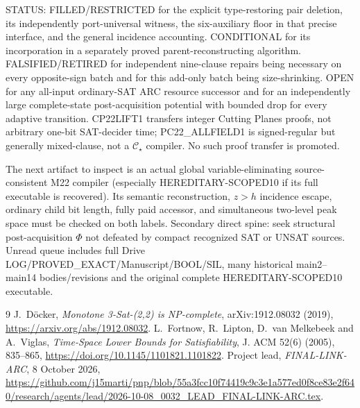 \documentclass[11pt]{article}
\begin{document}
STATUS: FILLED/RESTRICTED for the explicit type-restoring pair deletion, its independently port-universal witness, the six-auxiliary floor in that precise interface, and the general incidence accounting. CONDITIONAL for its incorporation in a separately proved parent-reconstructing algorithm. FALSIFIED/RETIRED for independent nine-clause repairs being necessary on every opposite-sign batch and for this add-only batch being size-shrinking. OPEN for any all-input ordinary-SAT ARC resource successor and for an independently large complete-state post-acquisition potential with bounded drop for every adaptive transition. CP22LIFT1 transfers integer Cutting Planes proofs, not arbitrary one-bit SAT-decider time; PC22_ALLFIELD1 is signed-regular but generally mixed-clause, not a $\mathcal C_\star$ compiler. No such proof transfer is promoted.

The next artifact to inspect is an actual global variable-eliminating source-consistent M22 compiler (especially HEREDITARY-SCOPED10 if its full executable is recovered). Its semantic reconstruction, $z>h$ incidence escape, ordinary child bit length, fully paid accessor, and simultaneous two-level peak space must be checked on both labels. Secondary direct spine: seek structural post-acquisition $\Phi$ not defeated by compact recognized SAT or UNSAT sources. Unread queue includes full Drive LOG/PROVED\_EXACT/Manuscript/BOOL/SIL, many historical main2--main14 bodies/revisions and the original complete HEREDITARY-SCOPED10 executable.

\begin{thebibliography}{9}
 J.~D\"ocker, \emph{Monotone 3-Sat-(2,2) is NP-complete}, arXiv:1912.08032 (2019), \url{https://arxiv.org/abs/1912.08032}.
 L.~Fortnow, R.~Lipton, D.~van Melkebeek and A.~Viglas, \emph{Time-Space Lower Bounds for Satisfiability}, J. ACM 52(6) (2005), 835--865, \url{https://doi.org/10.1145/1101821.1101822}.
 Project lead, \emph{FINAL-LINK-ARC}, 8 October 2026, \url{https://github.com/j15marti/pnp/blob/55a3fcc10f74419c9c3e1a577ed0f8ce83e2f640/research/agents/lead/2026-10-08_0032_LEAD_FINAL-LINK-ARC.tex}.
\end{thebibliography}
\end{document}
